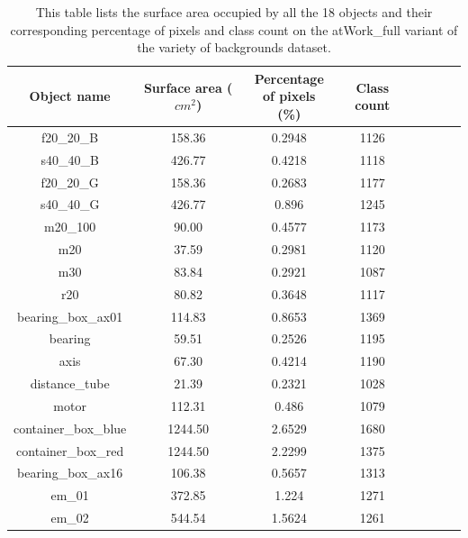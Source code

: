 		\begin{table}
			\centering
			\begin{tabular}{|c|c|c|c|c|c|c|c|}
			\hline 
  			\textbf{Object name} & \textbf{Surface area ($cm^2$)} & \makecell{\textbf{Percentage} \\ \textbf{of pixels (\%)}} & \textbf{Class count} \\ 
			\hline
  			 f20\_20\_B & 158.36 & 0.2948 & 1126 \\ 
			\hline
  			 s40\_40\_B & 426.77 & 0.4218 & 1118 \\ 
			\hline
  			 f20\_20\_G & 158.36 & 0.2683 & 1177 \\ 
			\hline
  			 s40\_40\_G & 426.77 & 0.896 & 1245 \\ 
			\hline
  			 m20\_100 & 90.00 & 0.4577 & 1173 \\ 
			\hline
  			 m20 & 37.59 & 0.2981 & 1120 \\ 
			\hline
  			 m30 & 83.84 & 0.2921 & 1087 \\ 
			\hline
  			 r20 & 80.82 & 0.3648 & 1117 \\ 
			\hline
  			 bearing\_box\_ax01 & 114.83 & 0.8653 & 1369 \\ 
			\hline
  			 bearing & 59.51 & 0.2526 & 1195 \\ 
			\hline
  			 axis & 67.30 & 0.4214 & 1190 \\ 
			\hline
  			 distance\_tube & 21.39 & 0.2321 & 1028 \\ 
			\hline
  			 motor & 112.31 & 0.486 & 1079 \\ 
			\hline
  			 container\_box\_blue & 1244.50 & 2.6529 & 1680 \\ 
			\hline
  			 container\_box\_red & 1244.50 & 2.2299 & 1375 \\ 
			\hline
  			 bearing\_box\_ax16 & 106.38 & 0.5657 & 1313 \\ 
			\hline
  			 em\_01 & 372.85 & 1.224 & 1271 \\ 
			\hline
  			 em\_02 & 544.54 & 1.5624 & 1261 \\ 
			\hline
			\end{tabular}
			\caption{This table lists the surface area occupied by all the 18 objects and their corresponding percentage of pixels and class count on the atWork\_full variant of the variety of backgrounds dataset.} 
			\label{Table:surface}
		\end{table}
		
